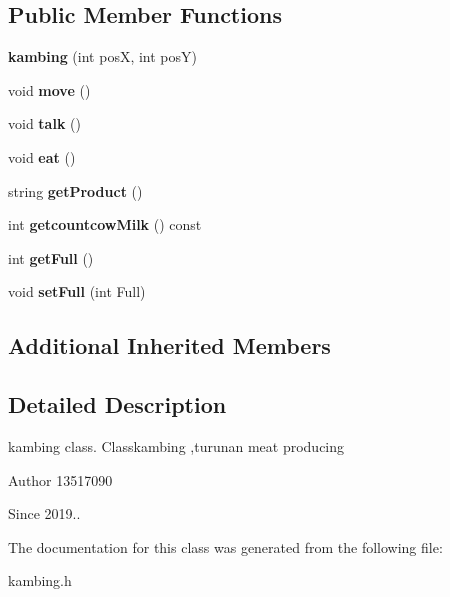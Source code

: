 \subsection*{Public Member Functions}
\begin{DoxyCompactItemize}
\item 
\mbox{\label{classkambing_aada5f7194815a6ff15fef4fd12ddc2ce}} 
{\bfseries kambing} (int posX, int posY)
\item 
\mbox{\label{classkambing_af73a4db7712d8d97e8a0f48e2c6b47f0}} 
void {\bfseries move} ()
\item 
\mbox{\label{classkambing_a9540126ad13162880929146d5a9ad473}} 
void {\bfseries talk} ()
\item 
\mbox{\label{classkambing_aca6072b89b48d7df2b3c34eecb31ca69}} 
void {\bfseries eat} ()
\item 
\mbox{\label{classkambing_a9d043eee9316f7fefb0f15d16a50b116}} 
string {\bfseries get\+Product} ()
\item 
\mbox{\label{classkambing_a4e02d3e7e1684a14ad372e180adce2d2}} 
int {\bfseries getcountcow\+Milk} () const
\item 
\mbox{\label{classkambing_a52c9800cebba7544eac66343261e192b}} 
int {\bfseries get\+Full} ()
\item 
\mbox{\label{classkambing_a2b3670a955dd6b7024eb2fa8dd4b0ed2}} 
void {\bfseries set\+Full} (int Full)
\end{DoxyCompactItemize}
\subsection*{Additional Inherited Members}


\subsection{Detailed Description}
kambing class. Classkambing ,turunan meat producing \begin{DoxyAuthor}{Author}
13517090 
\end{DoxyAuthor}
\begin{DoxySince}{Since}
2019.. 
\end{DoxySince}


The documentation for this class was generated from the following file\+:\begin{DoxyCompactItemize}
\item 
kambing.\+h\end{DoxyCompactItemize}

